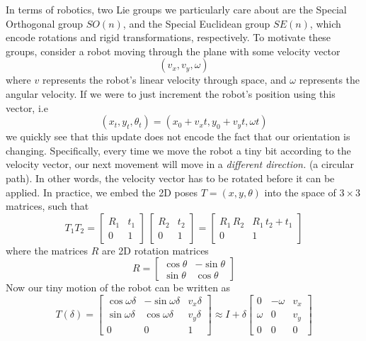 \documentclass[reqno]{amsart}
\theoremstyle{definition}
\numberwithin{equation}{section}
\begin{document}
In terms of robotics, two Lie groups we particularly care about are the Special Orthogonal group $SO(n)$, and the Special Euclidean group $SE(n)$, which encode rotations and rigid transformations, respectively. To motivate these groups, consider a robot moving through the plane with some velocity vector
\begin{equation*}
    (v_x, v_y, \omega)
\end{equation*}
where $v$ represents the robot's linear velocity through space, and $\omega$ represents the angular velocity. If we were to just increment the robot's position using this vector, i.e
\begin{equation*}
    (x_t, y_t, \theta_t) = (x_0 + v_x t, y_0 + v_y t, \omega t)
\end{equation*}
 we quickly see that this update does not encode the fact that our orientation is changing. Specifically, every time we move the robot a tiny bit according to the velocity vector, our next movement will move in a \textit{different direction.} (a circular path). In other words, the velocity vector has to be rotated before it can be applied. In practice, we embed the 2D poses $T = (x, y, \theta)$ into the space of $3 \times 3$ matrices, such that
 \begin{equation*}
    T_1T_2 = \begin{bmatrix}
        R_1 & t_1 \\
        0 & 1
    \end{bmatrix}\,\begin{bmatrix}
        R_2 & t_2 \\
        0 & 1
    \end{bmatrix} = \begin{bmatrix}
        R_1\,R_2 & R_1\,t_2 + t_1 \\
        0 & 1
    \end{bmatrix}
 \end{equation*}
 where the matrices $R$ are 2D rotation matrices
 \begin{equation*}
    R = \begin{bmatrix}
        \cos\theta &  -\sin\theta \\
        \sin\theta & \cos\theta
    \end{bmatrix}
 \end{equation*}
 Now our tiny motion of the robot can be written as
 \begin{equation*}
    T(\delta) = \begin{bmatrix}
        \cos\omega\delta & -\sin\omega\delta & v_x\delta \\
        \sin\omega\delta & \cos\omega\delta & v_y\delta \\
        0 & 0 & 1
    \end{bmatrix} \approx I + \delta\begin{bmatrix}
        0 & -\omega & v_x \\
        \omega & 0 & v_y \\
        0 & 0 & 0
    \end{bmatrix}
\end{equation*}
\end{document}
